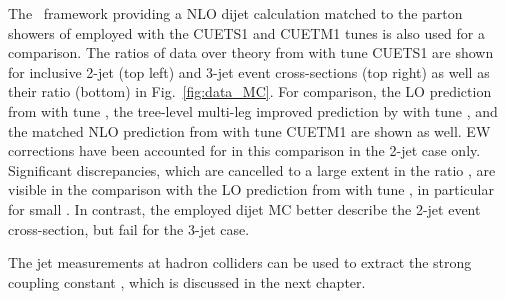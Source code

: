 The \POWHEG~framework providing a NLO dijet calculation matched to the parton showers of \PYTHIAE employed with the CUETS1 and CUETM1 tunes \cite{Khachatryan:2015pea} is also used for a comparison. The ratios of data over theory from \POWHEGn \plusn \PYTHIAE with tune CUETS1 are shown for inclusive 2-jet (top left) and 3-jet event cross-sections (top right) as well as their ratio \ratio (bottom) in Fig.~\ref{fig:data_MC}. For comparison, the LO prediction from \PYTHIAS with tune \Ztwostar, the tree-level multi-leg improved prediction by \MadGraphFn \plusn \PYTHIAS with tune \Ztwostar, and the matched NLO prediction from \POWHEGn \plusn \PYTHIAE with tune CUETM1 are shown as well. EW corrections have been accounted for in this comparison in the 2-jet case only. Significant discrepancies, which are cancelled to a large extent in the ratio \ratio, are visible in the comparison with the LO prediction from \MadGraphFn \plusn \PYTHIAS with tune \Ztwostar, in particular for small \httwo. In contrast, the employed dijet MC \POWHEGn \plusn \PYTHIAE better describe the 2-jet event cross-section, but fail for the 3-jet case.

The jet measurements at hadron colliders can be used to extract the strong coupling constant \alps, which is discussed in the next chapter.
